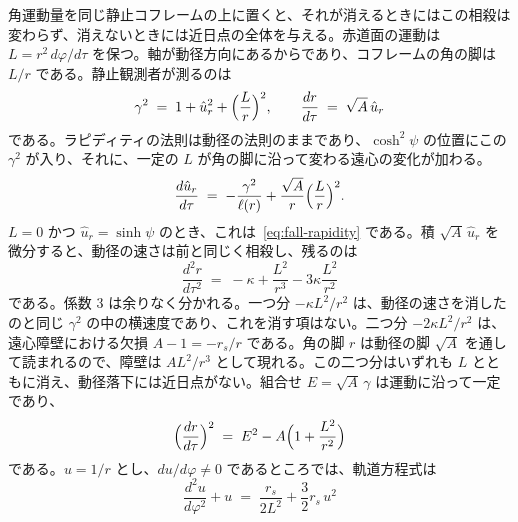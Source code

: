 \documentclass[a4paper]{article}
\begin{document}
角運動量を同じ静止コフレームの上に置くと、それが消えるときにはこの相殺は変わらず、消えないときには近日点の全体を与える。赤道面の運動は \(L=r^{2}\,d\varphi/d\tau\) を保つ。軸が動径方向にあるからであり、コフレームの角の脚は \(L/r\) である。静止観測者が測るのは
\begin{equation}
\gamma^{2} \;=\; 1+\hat{u}_{r}^{2}+\Bigl(\frac{L}{r}\Bigr)^{2},
\qquad
\frac{dr}{d\tau} \;=\; \sqrt{A}\,\hat{u}_{r}
\label{eq:angular-frame}
\end{equation}
である。ラピディティの法則は動径の法則のままであり、\(\cosh^{2}\psi\) の位置にこの \(\gamma^{2}\) が入り、それに、一定の \(L\) が角の脚に沿って変わる遠心の変化が加わる。
\begin{equation}
\frac{d\hat{u}_{r}}{d\tau} \;=\; -\frac{\gamma^{2}}{\ell(r)}+\frac{\sqrt{A}}{r}\Bigl(\frac{L}{r}\Bigr)^{2}.
\label{eq:angular-rapidity}
\end{equation}
\(L=0\) かつ \(\hat{u}_{r}=\sinh\psi\) のとき、これは~\eqref{eq:fall-rapidity} である。積 \(\sqrt{A}\,\hat{u}_{r}\) を微分すると、動径の速さは前と同じく相殺し、残るのは
\begin{equation}
\frac{d^{2}r}{d\tau^{2}} \;=\; -\kappa+\frac{L^{2}}{r^{3}}-3\kappa\frac{L^{2}}{r^{2}}
\label{eq:areal-angular}
\end{equation}
である。係数 \(3\) は余りなく分かれる。一つ分 \(-\kappa L^{2}/r^{2}\) は、動径の速さを消したのと同じ \(\gamma^{2}\) の中の横速度であり、これを消す項はない。二つ分 \(-2\kappa L^{2}/r^{2}\) は、遠心障壁における欠損 \(A-1=-r_{s}/r\) である。角の脚 \(r\) は動径の脚 \(\sqrt{A}\) を通して読まれるので、障壁は \(A L^{2}/r^{3}\) として現れる。この二つ分はいずれも \(L\) とともに消え、動径落下には近日点がない。組合せ \(E=\sqrt{A}\,\gamma\) は運動に沿って一定であり、
\begin{equation}
\Bigl(\frac{dr}{d\tau}\Bigr)^{2} \;=\; E^{2}-A\Bigl(1+\frac{L^{2}}{r^{2}}\Bigr)
\label{eq:orbit-energy}
\end{equation}
である。\(u=1/r\) とし、\(du/d\varphi\neq 0\) であるところでは、軌道方程式は
\begin{equation}
\frac{d^{2}u}{d\varphi^{2}}+u \;=\; \frac{r_{s}}{2L^{2}}+\frac{3}{2}r_{s}\,u^{2}
\label{eq:binet}
\end{equation}
\end{document}
